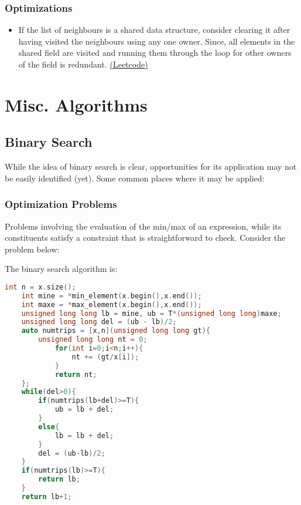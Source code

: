 \documentclass{article}
\begin{document}
\subsubsection*{Optimizations}
\begin{itemize}
    \item If the list of neighbours is a shared data structure, consider clearing it after having visited
    the neighbours using any one owner. Since, all elements in the shared field are visited and running them
    through the loop for other owners of the field is redundant. \href{https://leetcode.com/problems/jump-game-iv/}{(Leetcode)}
\end{itemize}
\section{Misc. Algorithms}
\subsection{Binary Search}
While the idea of binary search is clear, opportunities
for its application may not be easily identified (yet). Some
common places where it may be applied:
\subsubsection*{Optimization Problems}
Problems involving the evaluation of the min/max of an expression,
while its constituents satisfy a constraint that is straightforward to
check. Consider the problem below:\\
\begin{center}
\end{center}
The binary search algorithm is:
\begin{lstlisting}[language=C++,caption=BinSearch]
    int n = x.size();
    int mine = *min_element(x.begin(),x.end());
    int maxe = *max_element(x.begin(),x.end());
    unsigned long long lb = mine, ub = T*(unsigned long long)maxe;
    unsigned long long del = (ub - lb)/2;
    auto numtrips = [x,n](unsigned long long gt){
        unsigned long long nt = 0;
            for(int i=0;i<n;i++){
                nt += (gt/x[i]);
            }
            return nt;
    };
    while(del>0){
        if(numtrips(lb+del)>=T){
            ub = lb + del;
        }
        else{
            lb = lb + del;
        }
        del = (ub-lb)/2;
    }
    if(numtrips(lb)>=T){
        return lb;
    }
    return lb+1;
\end{lstlisting}
\end{document}
